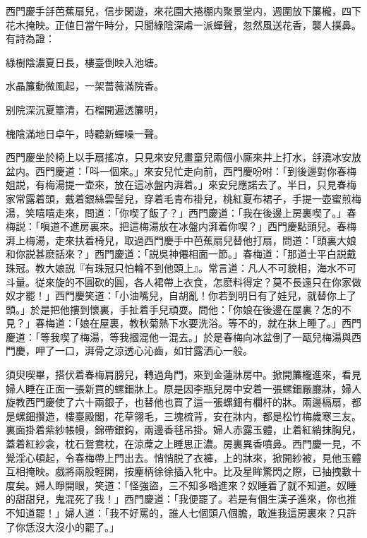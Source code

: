 西門慶手㧱芭蕉扇兒，信步閑遊，來花園大捲棚内聚景堂内，週圍放下簾櫳，四下花木掩映。正値日當午時分，只聞綠陰深䖏一派蟬聲，忽然風送花香，襲人撲鼻。有詩為證：

\begin{myquote}
綠樹陰濃夏日長，樓臺倒映入池塘。

水晶簾動微風起，一架薔薇滿院香。

别院深沉夏簟清，石榴開遍透簾明，

槐陰滿地日卓午，時聽新蟬噪一聲。
\end{myquote}

西門慶坐於椅上以手扇搖凉，只見來安兒畫童兒兩個小廝來井上打水，㧱澆冰安放盆内。西門慶道：「呌一個來。」來安兒忙走向前，西門慶吩咐：「到後邊對你春梅姐説，有梅湯提一壶來，放在這冰盤内湃着。」來安兒應諾去了。半日，只見春梅家常露着頭，戴着銀絲雲髻兒，穿着毛青布褂兒，桃紅夏布裙子，手提一壺蜜煎梅湯，笑嘻嘻走來，問道：「你喫了飯了？」西門慶道：「我在後邊上房裏喫了。」春梅説：「嗔道不進房裏來。把這梅湯放在冰盤内湃着你喫？」西門慶點頭兒。春梅湃上梅湯，走來扶着椅兒，取過西門慶手中芭蕉扇兒替他打扇，問道：「頭裏大娘和你説甚麽話來？」西門慶道：「説吳神僊相面一節。」春梅道：「那道士平白説戴珠冠。教大娘説『有珠冠只怕輪不到他頭上』。常言道：凡人不可貌相，海水不可斗量。従來旋的不圓砍的圓，各人裙帶上衣食，怎麽料得定？莫不長遠只在你家做奴才罷！」西門慶笑道：「小油嘴兒，自胡亂！你若到明日有了娃兒，就替你上了頭。」於是把他摟到懷裏，手扯着手兒頑耍。問他：「你娘在後邊在屋裏？怎的不見？」春梅道：「娘在屋裏，教秋菊熱下水要洗浴。等不的，就在牀上睡了。」西門慶道：「等我喫了梅湯，等我摑混他一混去。」於是春梅向冰盆倒了一甌兒梅湯與西門慶，呷了一口，湃骨之涼透心沁齒，如甘露洒心一般。

須臾喫畢，搭伏着春梅肩膀兒，轉過角門，來到金蓮牀房中。掀開簾櫳進來，看見婦人睡在正面一張新買的螺鈿牀上。原是因李瓶兒房中安着一張螺鈿厰廳牀，婦人旋教西門慶使了六十兩銀子，也替他也買了這一張螺鈿有欄杆的牀。兩邊槅扇，都是螺鈿攢造，樓臺殿閣，花草翎毛，三塊梳背，安在牀内，都是松竹梅歲寒三友。裏面掛着紫紗帳幔，錦帶銀鈎，兩邊香毬吊掛。婦人赤露玉體，止着紅綃抹胸兒，蓋着紅紗衾，枕石鴛鴦枕，在涼蓆之上睡思正濃。房裏異香噴鼻。西門慶一見，不覺淫心頓起，令春梅帶上門出去。悄悄脱了衣褲，上的牀來，掀開紗被，見他玉體互相掩映。戲將兩股輕開，按麈柄徐徐插入牝中。比及星眸驚閃之際，已抽拽數十度矣。婦人睜開眼，笑道：「怪強盜，三不知多喒進來？奴睡着了就不知道。奴睡的甜甜兒，鬼混死了我！」西門慶道：「我便罷了。若是有個生漢子進來，你也推不知道罷！」婦人道：「我不好罵的，誰人七個頭八個膽，敢進我這房裏來？只許了你恁沒大沒小的罷了。」

